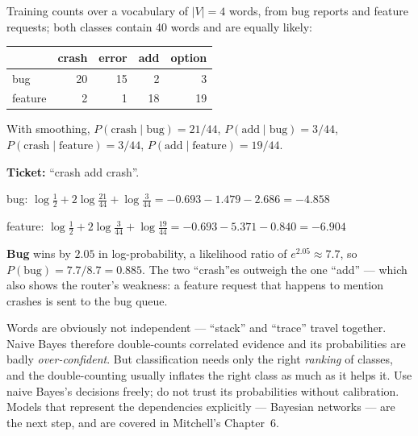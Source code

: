 \begin{worked}
Training counts over a vocabulary of $|V| = 4$ words, from bug reports and feature
requests; both classes contain 40 words and are equally likely:

\smallskip
\begin{center}
\begin{tabular}{@{}lrrrr@{}}
\toprule
 & \textbf{crash} & \textbf{error} & \textbf{add} & \textbf{option} \\
\midrule
bug & 20 & 15 & 2 & 3 \\
feature & 2 & 1 & 18 & 19 \\
\bottomrule
\end{tabular}
\end{center}

\smallskip
With smoothing, $P(\text{crash}\mid\text{bug}) = 21/44$, $P(\text{add}\mid\text{bug}) = 3/44$,
$P(\text{crash}\mid\text{feature}) = 3/44$, $P(\text{add}\mid\text{feature}) = 19/44$.

\textbf{Ticket:} ``crash add crash''.
\begin{tight}
  \item bug: $\log\tfrac{1}{2} + 2\log\tfrac{21}{44} + \log\tfrac{3}{44}
        = -0.693 - 1.479 - 2.686 = -4.858$
  \item feature: $\log\tfrac{1}{2} + 2\log\tfrac{3}{44} + \log\tfrac{19}{44}
        = -0.693 - 5.371 - 0.840 = -6.904$
\end{tight}
\textbf{Bug} wins by $2.05$ in log-probability, a likelihood ratio of
$e^{2.05} \approx 7.7$, so $P(\text{bug}) = 7.7/8.7 = \mathbf{0.885}$. The two
``crash''es outweigh the one ``add'' --- which also shows the router's weakness: a
feature request that happens to mention crashes is sent to the bug queue.
\end{worked}

\begin{alertbox}
Words are obviously not independent --- ``stack'' and ``trace'' travel together.
Naive Bayes therefore double-counts correlated evidence and its probabilities are
badly \emph{over-confident}. But classification needs only the right \emph{ranking}
of classes, and the double-counting usually inflates the right class as much as
it helps it. Use naive Bayes's decisions freely; do not trust its probabilities
without calibration. Models that represent the dependencies explicitly --- Bayesian
networks --- are the next step, and are covered in Mitchell's Chapter~6.
\end{alertbox}

